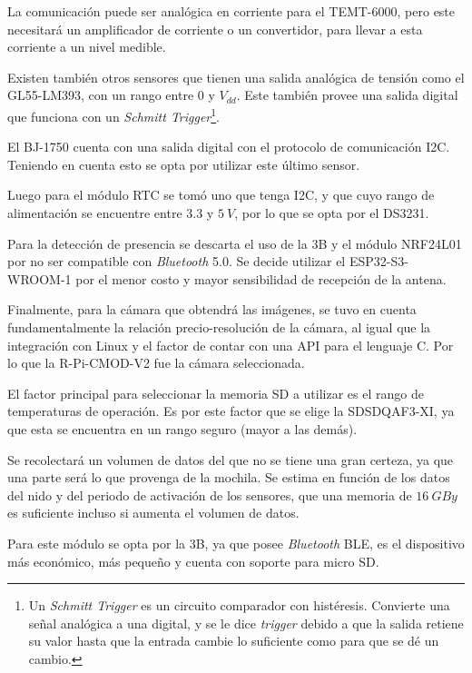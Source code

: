 La comunicación puede ser analógica en corriente para el TEMT-6000, pero este necesitará un amplificador de corriente o un convertidor, para llevar a esta corriente a un nivel medible.

Existen también otros sensores que tienen una salida analógica de tensión como el GL55-LM393, con un rango entre 0 y $V_{dd}$. Este también provee una salida digital que funciona con un \textit{Schmitt Trigger}\footnote{Un \textit{Schmitt Trigger} es un circuito comparador con histéresis. Convierte una señal analógica a una digital, y se le dice \textit{trigger} debido a que la salida retiene su valor hasta que la entrada cambie lo suficiente como para que se dé un cambio.}.

El BJ-1750 cuenta con una salida digital con el protocolo de comunicación I2C. Teniendo en cuenta esto se opta por utilizar este último sensor. 

Luego para el módulo RTC se tomó uno que tenga I2C, y que cuyo rango de alimentación se encuentre entre $3.3$ y $5 \ V$, por lo que se opta por el DS3231.

Para la detección de presencia se descarta el uso de la \rpi 3B y el módulo NRF24L01 por no ser compatible con \textit{Bluetooth} 5.0. Se decide utilizar el ESP32-S3-WROOM-1 por el menor costo y mayor sensibilidad de recepción de la antena.

Finalmente, para la cámara que obtendrá las imágenes, se tuvo en cuenta fundamentalmente la relación precio-resolución de la cámara, al igual que la integración con Linux y el factor de contar con una API para el lenguaje C. Por lo que la R-Pi-CMOD-V2 fue la cámara seleccionada.


El factor principal para seleccionar la memoria SD a utilizar es el rango de temperaturas de operación. Es por este factor que se elige la SDSDQAF3-XI, ya que esta se encuentra en un rango seguro (mayor a las demás).

Se recolectará un volumen de datos del que no se tiene una gran certeza, ya que una parte será lo que provenga de la mochila. Se estima en función de los datos del nido y del periodo de activación de los sensores, que una memoria de $16 \ GBy$ es suficiente incluso si aumenta el volumen de datos.


Para este módulo se opta por la \rspi 3B, ya que posee \textit{Bluetooth} BLE, es el dispositivo más económico, más pequeño y cuenta con soporte para micro SD.

